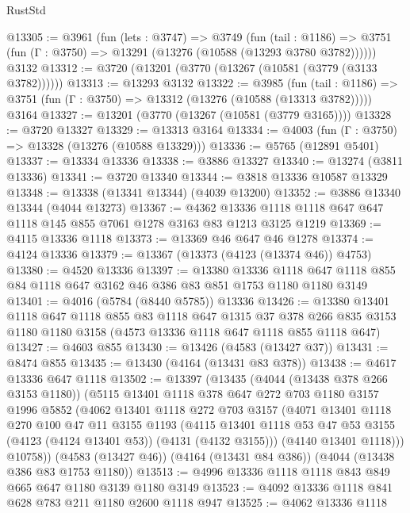 \begin{lexlean}{RustStd}
\begin{coremodule}
@13305 := @3961
    (fun (lets : @3747) =>
    @3749
      (fun (tail : @1186) =>
      @3751 (fun (Γ : @3750) => @13291 (@13276 (@10588 (@13293 @3780 @3782))))))
    @3132
@13312 := @3720 (@13201 (@3770 (@13267 (@10581 (@3779 (@3133 @3782))))))
@13313 := @13293 @3132
@13322 := @3985
    (fun (tail : @1186) => @3751 (fun (Γ : @3750) => @13312 (@13276 (@10588 (@13313 @3782)))))
    @3164
@13327 := @13201 (@3770 (@13267 (@10581 (@3779 @3165))))
@13328 := @3720 @13327
@13329 := @13313 @3164
@13334 := @4003 (fun (Γ : @3750) => @13328 (@13276 (@10588 @13329)))
@13336 := @5765 (@12891 @5401)
@13337 := @13334 @13336
@13338 := @3886 @13327
@13340 := @13274 (@3811 @13336)
@13341 := @3720 @13340
@13344 := @3818 @13336 @10587 @13329
@13348 := @13338 (@13341 @13344) (@4039 @13200)
@13352 := @3886 @13340 @13344 (@4044 @13273)
@13367 := @4362 @13336 @1118 @1118 @647 @647 @1118 @145 @855 @7061 @1278 @3163 @83 @1213 @3125 @1219
@13369 := @4115 @13336 @1118
@13373 := @13369 @46 @647 @46 @1278
@13374 := @4124 @13336
@13379 := @13367 (@13373 (@4123 (@13374 @46)) @4753)
@13380 := @4520 @13336
@13397 := @13380
    @13336
    @1118
    @647
    @1118
    @855
    @84
    @1118
    @647
    @3162
    @46
    @386
    @83
    @851
    @1753
    @1180
    @1180
    @3149
@13401 := @4016 (@5784 (@8440 @5785)) @13336
@13426 := @13380
    @13401
    @1118
    @647
    @1118
    @855
    @83
    @1118
    @647
    @1315
    @37
    @378
    @266
    @835
    @3153
    @1180
    @1180
    @3158
    (@4573 @13336 @1118 @647 @1118 @855 @1118 @647)
@13427 := @4603 @855
@13430 := @13426 (@4583 (@13427 @37))
@13431 := @8474 @855
@13435 := @13430 (@4164 (@13431 @83 @378))
@13438 := @4617 @13336 @647 @1118
@13502 := @13397
    (@13435
      (@4044 (@13438 @378 @266 @3153 @1180))
      (@5115
        @13401
        @1118
        @378
        @647
        @272
        @703
        @1180
        @3157
        @1996
        @5852
        (@4062
          @13401
          @1118
          @272
          @703
          @3157
          (@4071
            @13401
            @1118
            @270
            @100
            @47
            @11
            @3155
            @1193
            (@4115 @13401 @1118 @53 @47 @53 @3155 (@4123 (@4124 @13401 @53)) (@4131 (@4132 @3155)))
            (@4140 @13401 @1118)))
        @10758))
    (@4583 (@13427 @46))
    (@4164 (@13431 @84 @386))
    (@4044 (@13438 @386 @83 @1753 @1180))
@13513 := @4996 @13336 @1118 @1118 @843 @849 @665 @647 @1180 @3139 @1180 @3149
@13523 := @4092 @13336 @1118 @841 @628 @783 @211 @1180 @2600 @1118 @947
@13525 := @4062 @13336 @1118

\end{coremodule}
\end{lexlean}
